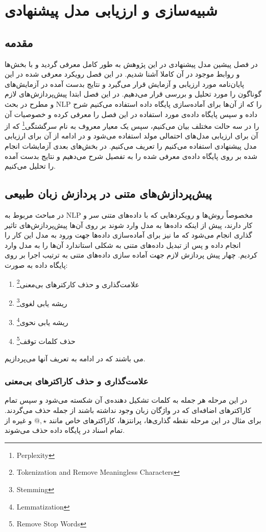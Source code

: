\chapter{شبیه‌سازی و ارزیابی مدل پیشنهادی}
\label{chap5}
\thispagestyle{empty}
\section{مقدمه}
\label{chap5sec1}
در فصل پیشین مدل پیشنهادی در این پژوهش به طور کامل معرفی‌ گردید و با بخش‌ها و روابط موجود در آن کاملا آشنا شدیم. در این فصل رویکرد معرفی‌ شده در این پایان‌‌نامه مورد  ارزیابی و آزمایش قرار می‌‌گیرد و نتایج بدست آمده در آزمایش‌های گوناگون را مورد تحلیل و بررسی‌ قرار می‌‌دهیم. در این فصل ابتدا پیش‌پردازش‌های لازم و مطرح در بحث 
NLP
را که از آن‌ها برای آماده‌سازی پایگاه داده استفاده می‌کنیم شرح داده و سپس پایگاه داده‌ی مورد استفاده در این فصل را معرفی کرده و خصوصیات آن را در سه‌ حالت مختلف بیان می‌‌کنیم، سپس یک معیار معروف به نام سرگشتگی\footnote{Perplexity}
که از آن برای ارزیابی مدل‌های احتمالی‌ مولد استفاده می‌شود و در ادامه از آن برای ارزیابی مدل پیشنهادی استفاده می‌‌کنیم را تعریف می‌‌کنیم. در بخش‌های بعدی آزمایشات انجام شده بر روی پایگاه داد‌ه‌ی معرفی‌ شده را به تفصیل شرح می‌‌دهیم و نتایج بدست آمده را تحلیل می‌‌کنیم.

\section{پیش‌پردازش‌های متنی در پردازش زبان طبیعی}
\label{chap5sec2}
در مباحث مربوط به
NLP
مخصوصاً روش‌ها و رویکردهایی که با داده‌های متنی سر و کار دارند، پیش از اینکه داده‌ها به مدل وارد شوند بر روی آن‌ها پیش‌پردازش‌های تاثیر گذاری انجام می‌‌شود که ما نیز برای آماده‌سازی داده‌ها جهت ورود به مدل این کار را انجام داده و پس از تبدیل داده‌های متنی به شکلی‌ استاندارد آن‌ها را به مدل وارد کردیم. چهار پیش پردازش لازم جهت آماده سازی داده‌های متنی به ترتیب اجرا بر روی پایگاه داده به صورت:
\begin{enumerate}
	\item علامت‌گذاری و حذف کارکترهای بی‌معنی\footnote{Tokenization and Remove Meaningless Characters}
	\item ریشه یابی لغوی\footnote{Stemming}
	\item ریشه یابی نحوی\footnote{Lemmatization}
	\item حذف کلمات توقف\footnote{Remove Stop Words}
\end{enumerate}
می‌ باشند که در ادامه به تعریف آنها می‌‌پردازیم.
\subsection{علامت‌گذاری و حذف کاراکترهای بی‌معنی‌}
\label{chap5sec2sub1}
در این مرحله هر جمله به کلمات تشکیل دهنده‌ی آن شکسته می‌‌شود و سپس تمام کاراکترهای اضافه‌ای ‌که در واژگان زبان وجود نداشته باشند از جمله حذف می‌‌گردند. برای مثال در این مرحله نقطه گذاری‌ها، پرانتزها، کاراکتر‌های خاص مانند
$@,  \star $
و غیره از تمام اسناد در پایگاه داده حذف می‌‌شوند.

